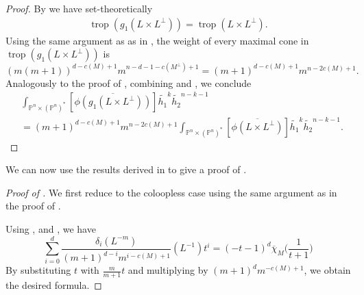 \documentclass[12pt,a4paper,english]{scrartcl}
\newcommand{\PP}{\mathbb{P}}
\DeclareMathOperator{\trop}{trop}
\begin{document}
\begin{proof}
 By  we have set-theoretically
\begin{align*}
      \trop(g_1(L\times L^\perp)) =\trop(L\times L^\perp). 
  \end{align*}
  Using the same argument as as in \cite[Lemma 4.9]{MatsubaraHeoTelen2026}, the weight of every maximal cone in $\trop(g_1(L\times L^\perp))$ is 
  \[
(m(m+1))^{d-c(M)+1}m^{n-d-1-c(M^\perp)+1}=(m+1)^{d-c(M)+1}m^{n-2c(M)+1}.
\]
Analogously to the proof of , combining \cite[Theorem 6.7.9]{Maclagan2015} and \cite[Theorem 3.12]{sturmfels2007tropical}, we conclude 
  \begin{align*}
     &\int_{\PP^n \times (\PP^n)^*}[\overline{\phi(g_1(L\times L^\perp))}]\widetilde{h_1}^k\widetilde{h_2}^{n-k-1} \\&= (m+1)^{d-c(M)+1}m^{n-2c(M)+1}\int_{\PP^n \times (\PP^n)^*}[\overline{\phi(L\times L^\perp)}]\widetilde{h_1}^k\widetilde{h_2}^{n-k-1}.
  \end{align*}
\end{proof}

We can now use the results derived in  to give a proof of .

\begin{proof}[Proof of ]


We first reduce to the coloopless case using the same argument as in the proof of .

    Using ,   and , we have
    \[
    \sum_{i =0}^d \frac{\delta_i(L^{-m})}{(m+1)^{d-i}m^{i-c(M)+1}}(L^{-1})t^i =
    (-t-1)^{d}\overline{\chi}_M\big(\frac{1}{t+1}\big)
    \]
    By substituting $t$ with $\frac{m}{m+1}t$ and multiplying by $(m+1)^dm^{-c(M)+1}$, we obtain the desired formula.
\end{proof}


\printbibliography
\end{document}
